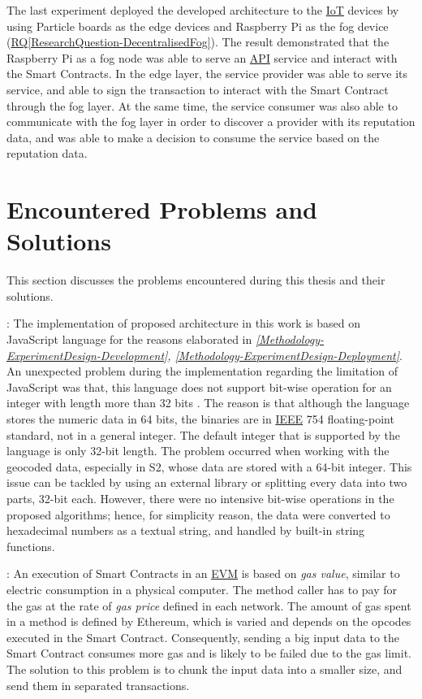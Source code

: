 \npara The last experiment deployed the developed architecture to the \hyperref[Acronym-IoT]{IoT} devices by using Particle boards as the edge devices and Raspberry Pi as the fog device (\hyperref[ResearchQuestion-DecentralisedFog]{RQ\ref{ResearchQuestion-DecentralisedFog}}).
The result demonstrated that the Raspberry Pi as a fog node was able to serve an \hyperref[Acronym-API]{API} service and interact with the Smart Contracts.
In the edge layer, the service provider was able to serve its service, and able to sign the transaction to interact with the Smart Contract through the fog layer.
At the same time, the service consumer was also able to communicate with the fog layer in order to discover a provider with its reputation data, and was able to make a decision to consume the service based on the reputation data.

\section*{Encountered Problems and Solutions} \label{Conclusion-Problems}

\npara This section discusses the problems encountered during this thesis and their solutions.

\npara {}:
The implementation of proposed architecture in this work is based on JavaScript language for the reasons elaborated in \textit{\ref{Methodology-ExperimentDesign-Development}, \ref{Methodology-ExperimentDesign-Deployment}}.
An unexpected problem during the implementation regarding the limitation of JavaScript was that, this language does not support bit-wise operation for an integer with length more than 32 bits \citep{JavaScriptOperators}.
The reason is that although the language stores the numeric data in 64 bits, the binaries are in \hyperref[Acronym-IEEE]{IEEE} 754 floating-point standard, not in a general integer.
The default integer that is supported by the language is only 32-bit length.
The problem occurred when working with the geocoded data, especially in S2, whose data are stored with a 64-bit integer.
This issue can be tackled by using an external library or splitting every data into two parts, 32-bit each.
However, there were no intensive bit-wise operations in the proposed algorithms; hence, for simplicity reason, the data were converted to hexadecimal numbers as a textual string, and handled by built-in string functions.

\npara {}:
An execution of Smart Contracts in an \hyperref[Acronym-EVM]{EVM} is based on \textit{gas value}, similar to electric consumption in a physical computer.
The method caller has to pay for the gas at the rate of \textit{gas price} defined in each network.
The amount of gas spent in a method is defined by Ethereum, which is varied and depends on the opcodes executed in the Smart Contract.
Consequently, sending a big input data to the Smart Contract consumes more gas and is likely to be failed due to the gas limit.
The solution to this problem is to chunk the input data into a smaller size, and send them in separated transactions.

